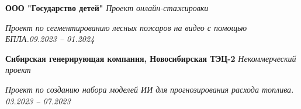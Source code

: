 
\textbf{ООО "Государство детей"} \hfill \emph{Проект онлайн-стажировки}

	\textit{Проект по сегментированию лесных пожаров на видео с помощью БПЛА.}\hfill \emph{09.2023 – 01.2024}\vspace{0.2cm}
	
	\textbf{Сибирская генерирующая компания, Новосибирская ТЭЦ-2} \hfill \emph{Некоммерческий проект}
	
\textit{Проект по созданию набора моделей ИИ для прогнозирования расхода топлива.} \hfill \emph{03.2023 – 07.2023}\vspace{0.2cm}